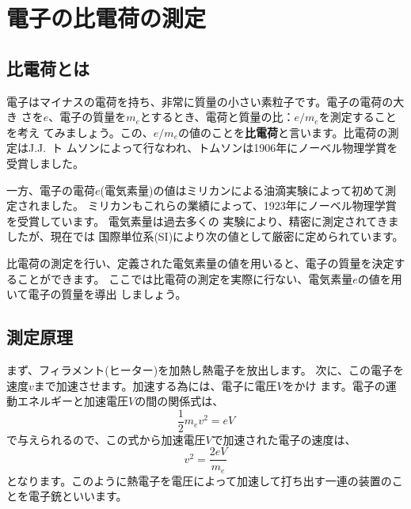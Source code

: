 %
%


\section{電子の比電荷の測定}

\subsection{比電荷とは}

電子はマイナスの電荷を持ち、非常に質量の小さい素粒子です。電子の電荷の大き 
さを$e$、電子の質量を$m_e$とするとき、電荷と質量の比：$e/m_e$を測定することを考え 
てみましょう。この、$e/m_e$の値のことを{\bf 比電荷}と言います。比電荷の測定はJ.J.~ト 
ムソンによって行なわれ、トムソンは1906年にノーベル物理学賞を受賞しました。

一方、電子の電荷$e$(電気素量)の値はミリカンによる油滴実験によって初めて測定されました。
ミリカンもこれらの業績によって、1923年にノーベル物理学賞を受賞しています。
電気素量は過去多くの
実験により、精密に測定されてきましたが、現在では
国際単位系(SI)により次の値として厳密に定められています。
\begin{center}
\end{center}

比電荷の測定を行い、定義された電気素量の値を用いると、電子の質量を決定することができます。
ここでは比電荷の測定を実際に行ない、電気素量$e$の値を用いて電子の質量を導出 
しましょう。

\subsection{測定原理}

まず、フィラメント(ヒーター)を加熱し熱電子を放出します。
次に、この電子を速度$v$まで加速させます。加速する為には、電子に電圧$V$をかけ
ます。電子の運動エネルギーと加速電圧$V$の間の関係式は、
\[
\frac{1}{2}m_ev^2 = e V
\]
で与えられるので、この式から加速電圧$V$で加速された電子の速度は、
\begin{equation}
v^2=\frac{2eV}{m_e}
\label{v square}
\end{equation}
となります。このように熱電子を電圧によって加速して打ち出す一連の装置のことを電子銃といいます。

\newpage

